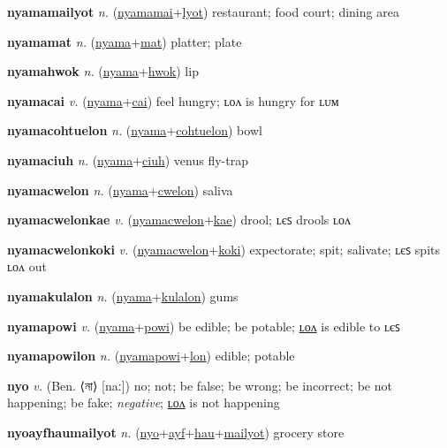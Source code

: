\textbf{\hypertarget{nyamamailyot}{nyamamailyot}} \textit{n.} (\hyperlink{nyamamai}{nyamamai}+\allowbreak \hyperlink{lyot}{lyot})
restaurant; food court; dining area

\textbf{\hypertarget{nyamamat}{nyamamat}} \textit{n.} (\hyperlink{nyama}{nyama}+\allowbreak \hyperlink{mat}{mat})
platter; plate

\textbf{\hypertarget{nyamahwok}{nyamahwok}} \textit{n.} (\hyperlink{nyama}{nyama}+\allowbreak \hyperlink{hwok}{hwok})
lip

\textbf{\hypertarget{nyamacai}{nyamacai}} \textit{v.} (\hyperlink{nyama}{nyama}+\allowbreak \hyperlink{cai}{cai})
feel hungry; ʟᴏᴧ is hungry for ʟᴜᴍ

\textbf{\hypertarget{nyamacohtuelon}{nyamacohtuelon}} \textit{n.} (\hyperlink{nyama}{nyama}+\allowbreak \hyperlink{cohtuelon}{cohtuelon})
bowl

\textbf{\hypertarget{nyamaciuh}{nyamaciuh}} \textit{n.} (\hyperlink{nyama}{nyama}+\allowbreak \hyperlink{ciuh}{ciuh})
venus fly-trap

\textbf{\hypertarget{nyamacwelon}{nyamacwelon}} \textit{n.} (\hyperlink{nyama}{nyama}+\allowbreak \hyperlink{cwelon}{cwelon})
saliva

\textbf{\hypertarget{nyamacwelonkae}{nyamacwelonkae}} \textit{v.} (\hyperlink{nyamacwelon}{nyamacwelon}+\allowbreak \hyperlink{kae}{kae})
drool; ʟєꜱ drools ʟᴏᴧ

\textbf{\hypertarget{nyamacwelonkoki}{nyamacwelonkoki}} \textit{v.} (\hyperlink{nyamacwelon}{nyamacwelon}+\allowbreak \hyperlink{koki}{koki})
expectorate; spit; salivate; ʟєꜱ spits ʟᴏᴧ out

\textbf{\hypertarget{nyamakulalon}{nyamakulalon}} \textit{n.} (\hyperlink{nyama}{nyama}+\allowbreak \hyperlink{kulalon}{kulalon})
gums

\textbf{\hypertarget{nyamapowi}{nyamapowi}} \textit{v.} (\hyperlink{nyama}{nyama}+\allowbreak \hyperlink{powi}{powi})
be edible; be potable; \hyperlink{nyamapowilon}{ʟᴏᴧ} is edible to ʟєꜱ

\textbf{\hypertarget{nyamapowilon}{nyamapowilon}} \textit{n.} (\hyperlink{nyamapowi}{nyamapowi}+\allowbreak \hyperlink{lon}{lon})
edible; potable

\textbf{\hypertarget{nyo}{nyo}} \textit{v.} (Ben. ⟨{\bengali{}না}⟩ [naː])
no; not; be false; be wrong; be incorrect; be not happening; be fake; \textit{negative}; \hyperlink{nyolon}{ʟᴏᴧ} is not happening

\textbf{\hypertarget{nyoayfhaumailyot}{nyoayfhaumailyot}} \textit{n.} (\hyperlink{nyo}{nyo}+\allowbreak \hyperlink{ayf}{ayf}+\allowbreak \hyperlink{hau}{hau}+\allowbreak \hyperlink{mailyot}{mailyot})
grocery store

